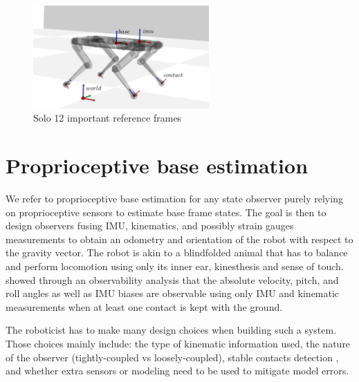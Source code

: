 \begin{figure}
    \centering
    \includegraphics[width=0.6\textwidth]{figures/solo_frames.pdf}
    \caption{Solo 12 \cite{grimminger2020open} important reference frames}
    \label{fig:solo_frames}
\end{figure}
    

\section{Proprioceptive base estimation}

We refer to proprioceptive base estimation for any state observer purely relying on proprioceptive sensors to estimate base frame states. 
The goal is then to design observers fusing IMU, kinematics, and possibly strain gauges measurements to obtain an odometry and orientation of 
the robot with respect to the gravity vector. The robot is akin to a blindfolded animal that has to balance and perform locomotion using 
only its inner ear, kinesthesis and sense of touch. \cite{bloesch2013state,rotella2014state} showed through an observability analysis 
that the absolute velocity, pitch, and roll angles as well as IMU biases are observable using only IMU and kinematic measurements when at 
least one contact is kept with the ground.

The roboticist has to make many design choices when building such a system. Those choices mainly include: the type of kinematic information used, 
the nature of the observer (tightly-coupled vs loosely-coupled), stable contacts detection , and whether extra sensors or modeling need 
to be used to mitigate model errors.
 

